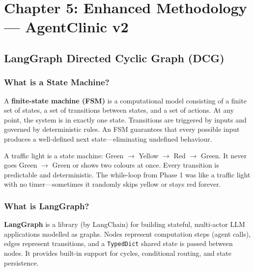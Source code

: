\section{Chapter 5: Enhanced Methodology --- AgentClinic v2}
\label{ch:enhanced}

\subsection{LangGraph Directed Cyclic Graph (DCG)}

\subsubsection{What is a State Machine?}

\begin{acadbox}[\textcolor{white}{Academic Definition}]
A \textbf{finite-state machine (FSM)} is a computational model consisting of a finite set of states, a set of transitions between states, and a set of actions. At any point, the system is in exactly one state. Transitions are triggered by inputs and governed by deterministic rules. An FSM guarantees that every possible input produces a well-defined next state---eliminating undefined behaviour.
\end{acadbox}

\begin{analogybox}[\textcolor{white}{Simple Analogy}]
A traffic light is a state machine: Green $\rightarrow$ Yellow $\rightarrow$ Red $\rightarrow$ Green. It never goes Green $\rightarrow$ Green or shows two colours at once. Every transition is predictable and deterministic. The while-loop from Phase 1 was like a traffic light with no timer---sometimes it randomly skips yellow or stays red forever.
\end{analogybox}

\subsubsection{What is LangGraph?}

\begin{acadbox}[\textcolor{white}{Academic Definition}]
\textbf{LangGraph} is a library (by LangChain) for building stateful, multi-actor LLM applications modelled as graphs. Nodes represent computation steps (agent calls), edges represent transitions, and a \texttt{TypedDict} shared state is passed between nodes. It provides built-in support for cycles, conditional routing, and state persistence.
\end{acadbox}

